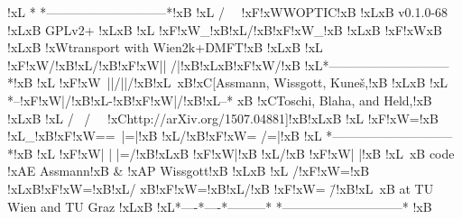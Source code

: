 !xL{}          *    *-----------------------------*!xB{}
!xL{}         / \    \ !xF{}!xW{}WOPTIC!xB{} !xL{}\!xB{} v0.1.0-68 !xL{}\!xB{} GPLv2+ !xL{}\!xB{}
!xL{}       !xF{}!xW{}_!xB{}!xL{}/!xB{}!xF{}!xW{}_!xB{}  !xL{}\!xB{} !xF{}!xW{}\!xB{}  !xL{}\!xB{} !xW{}transport with  Wien2k+DMFT!xB{} !xL{}\!xB{}
!xL{}      !xF{}!xW{}/!xB{}!xL{}/!xB{}!xF{}!xW{}|| /|!xB{}!xL{}\!xB{}!xF{}!xW{}/!xB{}   !xL{}*-----------------------------*!xB{}
!xL{}      !xF{}!xW{}\ ||/||/!xB{}!xL{}\    \!xB{}!xC{}[Assmann,  Wissgott,  Kuneš,!xB{} !xL{}\!xB{}
!xL{}     *--!xF{}!xW{}|/!xB{}!xL{}-!xB{}!xF{}!xW{}|/!xB{}!xL{}--*    \!xB{} !xC{}Toschi,  Blaha,  and  Held,!xB{} !xL{}\!xB{}
!xL{}    / \       / \    \ !xC{}http://arXiv.org/1507.04881]!xB{}!xL{}\!xB{}
!xL{}  !xF{}!xW{}=!xB{} !xL{}_!xB{}!xF{}!xW{}==\ |=|!xB{} !xL{}/!xB{}!xF{}!xW{}= /=|!xB{}  !xL{} *-----------------------------*!xB{}
!xL{} !xF{}!xW{}| | |=/!xB{}!xL{}\!xB{} !xF{}!xW{}|!xB{} !xL{}/!xB{} !xF{}!xW{}| |!xB{} !xL{}\    \!xB{} code !xA{}E Assmann!xB{} & !xA{}P Wissgott!xB{} !xL{}\!xB{}
!xL{} /!xF{}!xW{}=!xB{} !xL{}\!xB{}!xF{}!xW{}=!xB{}!xL{}/  \!xB{}!xF{}!xW{}=!xB{}!xL{}/!xB{}  !xF{}!xW{}= \=/!xB{}!xL{}\    \!xB{} at  TU  Wien  and  TU  Graz !xL{}\!xB{}
!xL{}*----*----*---------*    *-----------------------------*  !xB{}
